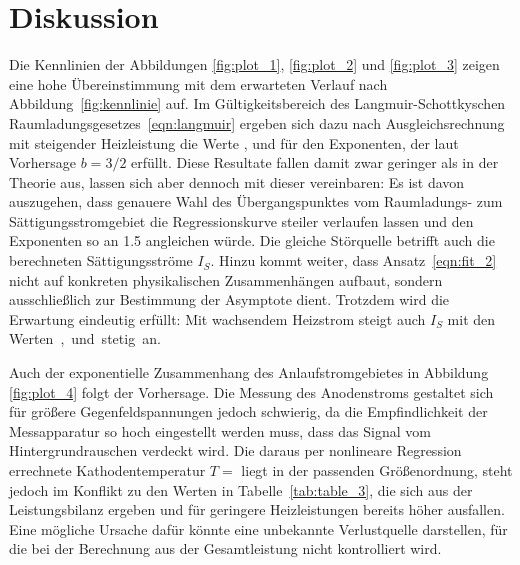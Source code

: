 \section{Diskussion}
\label{sec:diskussion}

Die Kennlinien der Abbildungen \ref{fig:plot_1}, \ref{fig:plot_2} und \ref{fig:plot_3} zeigen eine hohe Übereinstimmung mit dem
erwarteten Verlauf nach Abbildung~\ref{fig:kennlinie} auf. Im Gültigkeitsbereich des Langmuir-Schottkyschen
Raumladungsgesetzes~\eqref{eqn:langmuir} ergeben sich dazu nach Ausgleichsrechnung mit steigender Heizleistung die Werte
,  und  für den Exponenten, der laut Vorhersage $b = 3/2$ erfüllt. Diese
Resultate fallen damit zwar geringer als in der Theorie aus, lassen sich aber dennoch mit dieser vereinbaren: Es ist davon
auszugehen, dass genauere Wahl des Übergangspunktes vom Raumladungs- zum Sättigungsstromgebiet die Regressionskurve
steiler verlaufen lassen und den Exponenten so an \num{1.5} angleichen würde. Die gleiche Störquelle betrifft auch die
berechneten Sättigungsströme $I_S$. Hinzu kommt weiter, dass Ansatz~\eqref{eqn:fit_2} nicht auf konkreten physikalischen
Zusammenhängen aufbaut, sondern ausschließlich zur Bestimmung der Asymptote dient. Trotzdem wird die Erwartung eindeutig erfüllt:
Mit wachsendem Heizstrom steigt auch $I_S$ mit den \mbox{Werten ,  und 
stetig an.}

Auch der exponentielle Zusammenhang des Anlaufstromgebietes in Abbildung \ref{fig:plot_4} folgt der Vorhersage. Die Messung des
Anodenstroms gestaltet sich für größere Gegenfeldspannungen jedoch schwierig, da die Empfindlichkeit der Messapparatur so hoch
eingestellt werden muss, dass das Signal vom Hintergrundrauschen verdeckt wird. Die daraus per nonlineare Regression errechnete
Kathodentemperatur $T = $ liegt in der passenden Größenordnung, steht jedoch im Konflikt zu den Werten in
Tabelle~\ref{tab:table_3}, die sich aus der Leistungsbilanz ergeben und für geringere Heizleistungen bereits höher ausfallen.
Eine mögliche Ursache dafür könnte eine unbekannte Verlustquelle darstellen, für die bei der Berechnung aus der Gesamtleistung
nicht kontrolliert wird.

